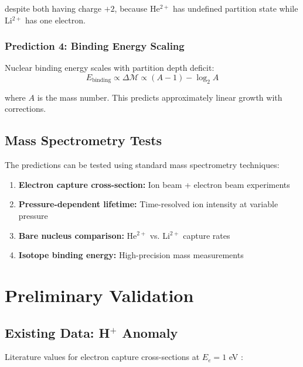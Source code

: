 \documentclass[twocolumn,10pt,a4paper]{article}
\theoremstyle{definition}
\theoremstyle{remark}
\newcommand{\Depth}{\mathcal{M}}
\begin{document}
despite both having charge $+2$, because He$^{2+}$ has undefined partition state while Li$^{2+}$ has one electron.

\subsubsection{Prediction 4: Binding Energy Scaling}

Nuclear binding energy scales with partition depth deficit:
\begin{equation}
    E_{\text{binding}} \propto \Delta\Depth \propto (A-1) - \log_2 A
\end{equation}

where $A$ is the mass number. This predicts approximately linear growth with corrections.

\subsection{Mass Spectrometry Tests}

The predictions can be tested using standard mass spectrometry techniques:

\begin{enumerate}
    \item \textbf{Electron capture cross-section:} Ion beam + electron beam experiments
    \item \textbf{Pressure-dependent lifetime:} Time-resolved ion intensity at variable pressure
    \item \textbf{Bare nucleus comparison:} He$^{2+}$ vs. Li$^{2+}$ capture rates
    \item \textbf{Isotope binding energy:} High-precision mass measurements
\end{enumerate}

\section{Preliminary Validation}
\label{sec:validation}

\subsection{Existing Data: H$^+$ Anomaly}

Literature values for electron capture cross-sections at $E_e = 1$ eV \cite{janev1987}:
\end{document}
